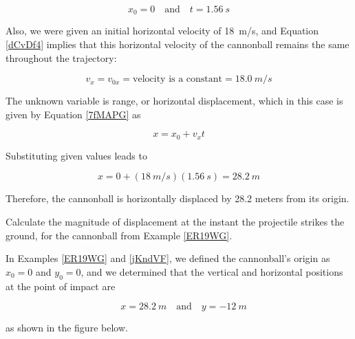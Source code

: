 \documentclass[main-physics.tex]{subfiles}
\begin{document}
\begin{equation*}
    x_0 = 0 \quad \text{and} \quad t = \SI{1.56}{s}
\end{equation*}

Also, we were given an initial horizontal velocity of \SI{18}{m/s}, and Equation \eqref{dCvDf4} implies that this horizontal velocity of the cannonball remains the same throughout the trajectory:

\begin{equation*}
    v_x = v_{0x} = \text{velocity is a constant} = \SI{18.0}{m/s}
\end{equation*}

The unknown variable is range, or horizontal displacement, which in this case is given by Equation \eqref{7fMAPG} as

\begin{equation*}
    x = x_0 + v_x t
\end{equation*}

Substituting given values leads to 

\begin{equation*}
    x = 0 + (\SI{18}{m/s})(\SI{1.56}{s}) = \SI{28.2}{m}
\end{equation*}

Therefore, the cannonball is horizontally displaced by 28.2 meters from its origin.

\endsolution

\begin{example}
    Calculate the magnitude of displacement at the instant the projectile strikes the ground, for the cannonball from Example \ref{ER19WG}.
\end{example}

\Solution In Examples \ref{ER19WG} and \ref{jKndVF}, we defined the cannonball's origin as $x_0 = 0$ and $y_0 = 0$, and we determined that the vertical and horizontal positions at the point of impact are

\begin{equation*}
    \quad x = \SI{28.2}{m} \quad \text{and} \quad y = \SI{-12}{m}
\end{equation*}

as shown in the figure below.

\begin{center}
\end{center}
\end{document}
